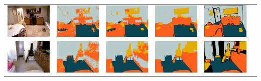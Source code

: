 \documentclass[final,ignorenonframetext,compress]{beamer}
\begin{document}
\begin{frame}
\begin{tabularx}{\linewidth}{@{\extracolsep{\fill}}cccccc}
    \includegraphics[width=.17\textwidth]{images/00781_image.png}&%
    \includegraphics[width=.17\linewidth]{images/00781_pixel.png}&%
    \includegraphics[width=.17\linewidth]{images/00781_svm.png}&%
    \includegraphics[width=.17\linewidth]{images/00781_ssvm.png}&%
    \includegraphics[width=.17\linewidth]{images/00781_gt.png}\\

    \includegraphics[width=.17\textwidth]{images/01331_image.png}&%
    \includegraphics[width=.17\linewidth]{images/01331_pixel.png}&%
    \includegraphics[width=.17\linewidth]{images/01331_svm.png}&%
    \includegraphics[width=.17\linewidth]{images/01331_ssvm.png}&%
    \includegraphics[width=.17\linewidth]{images/01331_gt.png}\\


\end{tabularx}
\end{frame}
\end{document}

